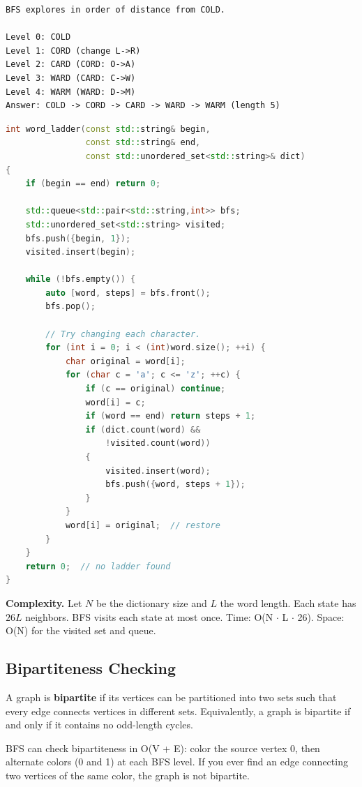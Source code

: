 \begin{verbatim}
BFS explores in order of distance from COLD.

Level 0: COLD
Level 1: CORD (change L->R)
Level 2: CARD (CORD: O->A)
Level 3: WARD (CARD: C->W)
Level 4: WARM (WARD: D->M)
Answer: COLD -> CORD -> CARD -> WARD -> WARM (length 5)
\end{verbatim}

\begin{lstlisting}[language=C++]
int word_ladder(const std::string& begin,
                const std::string& end,
                const std::unordered_set<std::string>& dict)
{
    if (begin == end) return 0;

    std::queue<std::pair<std::string,int>> bfs;
    std::unordered_set<std::string> visited;
    bfs.push({begin, 1});
    visited.insert(begin);

    while (!bfs.empty()) {
        auto [word, steps] = bfs.front();
        bfs.pop();

        // Try changing each character.
        for (int i = 0; i < (int)word.size(); ++i) {
            char original = word[i];
            for (char c = 'a'; c <= 'z'; ++c) {
                if (c == original) continue;
                word[i] = c;
                if (word == end) return steps + 1;
                if (dict.count(word) &&
                    !visited.count(word))
                {
                    visited.insert(word);
                    bfs.push({word, steps + 1});
                }
            }
            word[i] = original;  // restore
        }
    }
    return 0;  // no ladder found
}
\end{lstlisting}

\textbf{Complexity.} Let $N$ be the dictionary size and $L$ the word length. Each state has $26L$ neighbors. BFS visits each state at most once. Time: O(N $\cdot$ L $\cdot$ 26). Space: O(N) for the visited set and queue.

\subsection{Bipartiteness Checking}

A graph is \textbf{bipartite} if its vertices can be partitioned into two sets such that every edge connects vertices in different sets. Equivalently, a graph is bipartite if and only if it contains no odd-length cycles.

BFS can check bipartiteness in O(V + E): color the source vertex 0, then alternate colors (0 and 1) at each BFS level. If you ever find an edge connecting two vertices of the same color, the graph is not bipartite.

